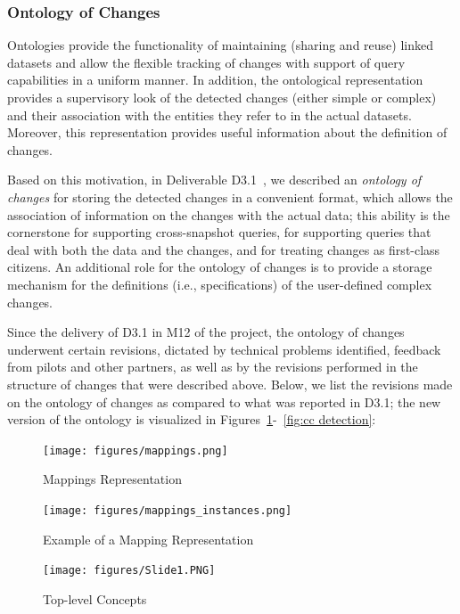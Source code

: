 \subsubsection{Ontology of Changes}

Ontologies provide the functionality of maintaining (sharing and reuse) linked datasets and allow the flexible tracking of changes with support of query capabilities in a uniform manner. In addition, the ontological representation provides a supervisory look of the detected changes (either simple or complex) and their association with the entities they refer to in the actual datasets. Moreover, this representation provides useful information about the definition of changes. 

Based on this motivation, in Deliverable D3.1~\cite{d3.1}, we described an \textit{ontology of changes} for storing the detected changes in a convenient format, which allows the 
association of information on the changes with the actual data; this ability is the cornerstone for supporting cross-snapshot queries, for supporting queries that deal with both the data and the changes, and for treating changes as first-class citizens. 
An additional role for the ontology of changes is to provide a storage mechanism for the definitions (i.e., specifications) of the user-defined complex changes.

Since the delivery of D3.1 in M12 of the project, the ontology of changes underwent certain revisions, dictated by technical problems identified, feedback from pilots and other partners, as well as by the revisions performed in the structure of changes that were described above. 
Below, we list the revisions made on the ontology of changes as compared to 
what was reported in D3.1; the new version of the ontology is visualized in Figures~\ref{fig:mappings}-~\ref{fig:cc detection}:

\begin{figure}[t]
\centering
\texttt{[image: figures/mappings.png]}
\caption{Mappings Representation}
\label{fig:mappings}
\end{figure}

\begin{figure}[t]
\centering
\texttt{[image: figures/mappings\_instances.png]}
\caption{Example of a Mapping Representation}
\label{fig:mappings_inst}
\end{figure}

\begin{figure}[H]
\centering
\texttt{[image: figures/Slide1.PNG]}
\caption{Top-level Concepts}
\label{fig:ontology of changes overview}
\end{figure}

